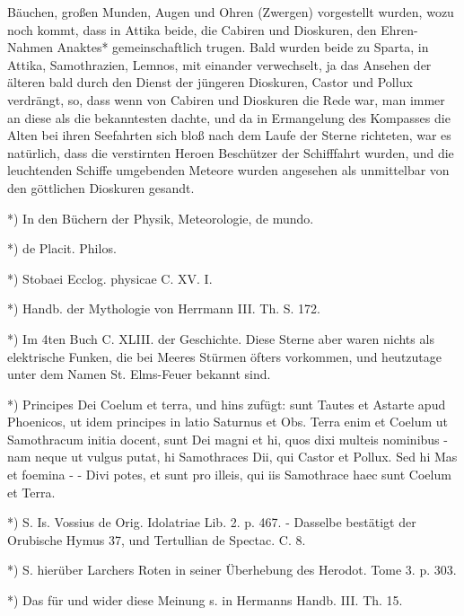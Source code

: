 \documentclass[a4paper, 11pt, oneside, polutonikogreek, german]{article}
\begin{document}
Bäuchen, großen Munden, Augen und Ohren (Zwergen) vorgestellt wurden, wozu noch kommt, dass in Attika beide, die Cabiren und Dioskuren, den Ehren-Nahmen Anaktes* gemeinschaftlich trugen. Bald wurden beide zu Sparta, in Attika, Samothrazien, Lemnos, mit einander verwechselt, ja das Ansehen der älteren bald durch den Dienst der jüngeren Dioskuren, Castor und Pollux verdrängt, so, dass wenn von Cabiren und Dioskuren die Rede war, man immer an diese als die bekanntesten dachte, und da in Ermangelung des Kompasses die Alten bei ihren Seefahrten sich bloß nach dem Laufe der Sterne richteten, war es natürlich, dass die verstirnten Heroen Beschützer der Schifffahrt wurden, und die leuchtenden Schiffe umgebenden Meteore wurden angesehen als unmittelbar von den göttlichen Dioskuren gesandt.

*) In den Büchern der Physik, Meteorologie, de mundo.

*) de Placit. Philos.

*) Stobaei Ecclog. physicae C. XV. I.

*) Handb. der Mythologie von Herrmann III. Th. S. 172.

*) Im 4ten Buch C. XLIII. der Geschichte. Diese Sterne aber waren nichts als elektrische Funken, die bei Meeres Stürmen öfters vorkommen, und heutzutage unter dem Namen St. Elms-Feuer bekannt sind.

*) Principes Dei Coelum et terra, und hins zufügt: sunt Tautes et Astarte apud Phoenicos, ut idem principes in latio Saturnus et Obs. Terra enim et Coelum ut Samothracum initia docent, sunt Dei magni et hi, quos dixi multeis nominibus - nam neque ut vulgus putat, hi Samothraces Dii, qui Castor et Pollux. Sed hi Mas et foemina - - Divi potes, et sunt pro illeis, qui iis Samothrace haec sunt Coelum et Terra.

*) S. Is. Vossius de Orig. Idolatriae Lib. 2. p. 467. - Dasselbe bestätigt der Orubische Hymus 37, und Tertullian de Spectac. C. 8.

*) S. hierüber Larchers Roten in seiner Überhebung des Herodot. Tome 3. p. 303.

*) Das für und wider diese Meinung s. in Hermanns Handb. III. Th. 15.
\end{document}

